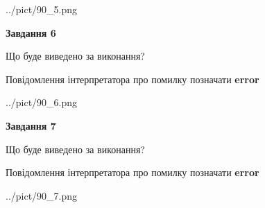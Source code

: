 \documentclass[10pt, ukrainian]{article}
\begin{document}
{\begin {large}
\begin{center}
	{../pict/90_5.png}
\end{center}
\newpage

{\begin {center}\textbf{Завдання 6}\end {center}}\par
Що буде виведено за виконання? \par
Повідомлення інтерпретатора про помилку позначати \textbf{error}

\begin{center}
	{../pict/90_6.png}
\end{center}
\newpage

{\begin {center}\textbf{Завдання 7}\end {center}}\par
Що буде виведено за виконання? \par
Повідомлення інтерпретатора про помилку позначати \textbf{error}

\begin{center}
	{../pict/90_7.png}
\end{center}
\newpage

\end {large}}
\end{document}
